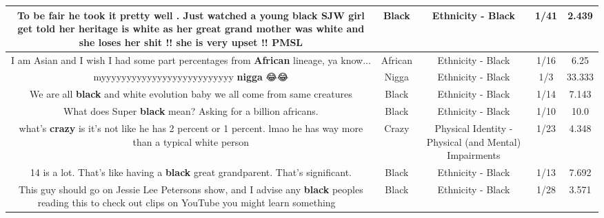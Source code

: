 \documentclass[11pt]{article}
\newlength\mylength
\begin{document}
\begin{center}
\begin{longtable}{|C{.65\mylength}|C{.30\mylength}|C{.12\mylength}|C{.12\mylength}|C{.12\mylength}|}
  \small To be fair he took it pretty well . Just watched a young \textbf{black} SJW girl get told her heritage is white as her great grand mother was white and she loses her shit !! she is very upset !! PMSL\normalsize   & Black & Ethnicity - Black & 1/41 & 2.439 \\  \hline
  \small I am Asian and I wish I had some part percentages from \textbf{African} lineage, ya know...\normalsize   & African & Ethnicity - Black & 1/16 & 6.25 \\  \hline
  \small myyyyyyyyyyyyyyyyyyyyyyyyyy \textbf{nigga} 😂😂\normalsize   & Nigga & Ethnicity - Black & 1/3 & 33.333 \\  \hline
  \small We are all \textbf{black} and white evolution baby we all come from same creatures\normalsize   & Black & Ethnicity - Black & 1/14 & 7.143 \\  \hline
  \small What does Super \textbf{black} mean? Asking for a billion africans.\normalsize   & Black & Ethnicity - Black & 1/10 & 10.0 \\  \hline
  \small what's \textbf{crazy} is it's not like he has 2 percent or 1 percent. lmao he has way more than a typical white person\normalsize   & Crazy & Physical Identity - Physical (and Mental) Impairments & 1/23 & 4.348 \\  \hline
  \small 14 is a lot. That's like having a \textbf{black} great grandparent. That's significant.\normalsize   & Black & Ethnicity - Black & 1/13 & 7.692 \\  \hline
  \small This guy should go on Jessie Lee Petersons show, and I advise any \textbf{black} peoples reading this to check out clips on YouTube you might learn something 👍🏻\normalsize   & Black & Ethnicity - Black & 1/28 & 3.571 \\  \hline

\end{longtable}
\end{center}
\end{document}
